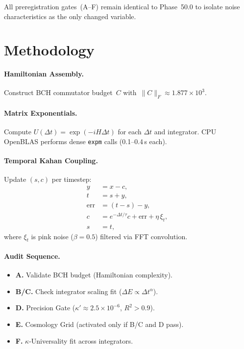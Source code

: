 \documentclass[11pt]{article}
\begin{document}
All preregistration gates~(A--F) remain identical to Phase~50.0 to isolate noise characteristics as the only changed variable.

\section{Methodology}
\paragraph{Hamiltonian Assembly.} Construct BCH commutator budget~\(C\) with~\(\|C\|_F \approx 1.877\times10^3\).

\paragraph{Matrix Exponentials.}
Compute \(U(\Delta t)=\exp(-iH\Delta t)\) for each $\Delta t$ and integrator.  
CPU OpenBLAS performs dense \texttt{expm} calls (0.1–0.4\,s each).

\paragraph{Temporal Kahan Coupling.}
Update $(s,c)$ per timestep:
\begin{align}
y &= x - c, \\
t &= s + y, \\
\mathrm{err} &= (t-s) - y, \\
c &= e^{-\Delta t/\tau} c + \mathrm{err} + \eta\,\xi_t, \\
s &= t,
\end{align}
where $\xi_t$ is pink noise ($\beta=0.5$) filtered via FFT convolution.

\paragraph{Audit Sequence.}
\begin{itemize}
  \item \textbf{A.} Validate BCH budget (Hamiltonian complexity).
  \item \textbf{B/C.} Check integrator scaling fit (\(\Delta E \propto \Delta t^{\alpha}\)).
  \item \textbf{D.} Precision Gate (\(\kappa' \approx 2.5\times10^{-6}\), $R^2>0.9$).
  \item \textbf{E.} Cosmology Grid (activated only if B/C and D pass).
  \item \textbf{F.} \(\kappa\)-Universality fit across integrators.
\end{itemize}
\end{document}
